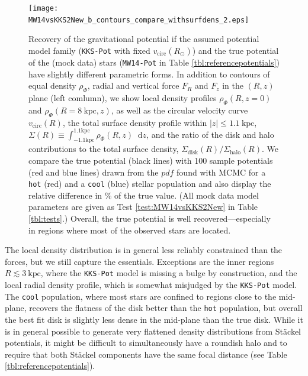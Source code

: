 \documentclass[iop,revtex4,numberedappendix,appendixfloats]{emulateapj}
\newcommand*\diff{\mathop{}\!\mathrm{d}}
\newcommand{\pdf}{\ensuremath{pdf}}
\begin{document}
\begin{figure}[!htb]
\centering
\texttt{[image: MW14vsKKS2New\_b\_contours\_compare\_withsurfdens\_2.eps]}
\caption{Recovery of the gravitational potential if the assumed potential model family (\texttt{KKS-Pot} with fixed $v_\text{circ}(R_\odot)$) and the true potential of the (mock data) stars (\texttt{MW14-Pot} in Table \ref{tbl:referencepotentials}) have slightly different parametric forms. In addition to contours of equal density $\rho_\Phi$, radial and vertical force $F_R$ and $F_z$ in the $(R,z)$ plane (left comlumn), we show local density profiles $\rho_\Phi(R,z=0)$ and $\rho_\Phi(R=8~\text{kpc},z)$, as well as the circular velocity curve $v_\text{circ}(R)$, the total surface density profile within $|z|\leq1.1~\text{kpc}$, $\Sigma(R) \equiv \int_{-1.1\text{kpc}}^{1.1\text{kpc}}\rho_\Phi(R,z)\diff z$, and the ratio of the disk and halo contributions to the total surface density, $\Sigma_\text{disk}(R)/\Sigma_\text{halo}(R)$. We compare the true potential (black lines) with 100 sample potentials (red and blue lines) drawn from the \pdf{} found with MCMC for a \texttt{hot} (red) and a \texttt{cool} (blue) stellar population and also display the relative difference in \% of the true value. (All mock data model parameters are given as Test \ref{test:MW14vsKKS2New} in Table \ref{tbl:tests}.) Overall, the true potential is well recovered---especially in regions where most of the observed stars are located.}
\label{fig:MW14vsKKS2New_contours}
\end{figure}

The local density distribution is in general less reliably constrained than the forces, but we still capture the essentials. Exceptions are the inner regions $R\lesssim3~\text{kpc}$, where the \texttt{KKS-Pot} model is missing a bulge by construction, and the local radial density profile, which is somewhat misjudged by the \texttt{KKS-Pot} model. The \texttt{cool} population, where most stars are confined to regions close to the mid-plane, recovers the flatness of the disk better than the \texttt{hot} population, but overall the best fit disk is slightly less dense in the mid-plane than the true disk. While it is in general possible to generate very flattened density distributions from St\"{a}ckel potentials, it might be difficult to simultaneously have a roundish halo and to require that both St\"{a}ckel components have the same focal distance (see Table \ref{tbl:referencepotentials}).
\end{document}

